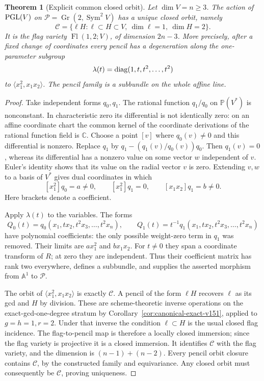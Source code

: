 \documentclass[11pt,reqno]{amsart}
\numberwithin{equation}{section}
\newtheorem{theorem}{Theorem}[section]
\theoremstyle{definition}\newtheorem{definition}[theorem]{Definition}
\theoremstyle{remark}\newtheorem{remark}[theorem]{Remark}
\newcommand{\C}{\mathbb C}\newcommand{\Q}{\mathbb Q}
\newcommand{\Pj}{\mathbb P}\newcommand{\A}{\mathbb A}
\DeclareMathOperator{\Sym}{Sym}\DeclareMathOperator{\Gr}{Gr}
\begin{document}
\begin{theorem}[Explicit common closed orbit]
\label{thm:closed-pencil-v151}
Let \(\dim V=n\geq3\).  The action of \(\operatorname{PGL}(V)\) on
\(\mathscr P=\Gr(2,\Sym^2V)\) has a unique closed orbit, namely
\begin{equation}\label{eq:flag-orbit-v151}
 \mathscr C=\{\ell H:\ell\subset H\subset V,\
                      \dim\ell=1,\ \dim H=2\}.
\end{equation}
It is the flag variety \(\operatorname{Fl}(1,2;V)\), of dimension
\(2n-3\).  More precisely, after a fixed change of coordinates every
pencil has a degeneration along the one-parameter subgroup
\[
                  \lambda(t)=\operatorname{diag}(1,t,t^2,\ldots,t^2)
\]
to \(\langle x_1^2,x_1x_2\rangle\).  The pencil family is a
subbundle on the whole affine line.
\end{theorem}
\begin{proof}
Take independent forms \(q_0,q_1\).  The rational function
\(q_1/q_0\) on \(\Pj(V^*)\) is nonconstant.  In characteristic
zero its differential is not identically zero: on an affine coordinate
chart the common kernel of the coordinate derivations of the rational
function field is \(\C\).  Choose a point \([v]\) where \(q_0(v)\ne0\)
and this differential is nonzero.  Replace \(q_1\) by
\(q_1-(q_1(v)/q_0(v))q_0\).  Then \(q_1(v)=0\), whereas its
differential has a nonzero value on some vector \(w\) independent of
\(v\).  Euler's identity shows that its value on the radial vector
\(v\) is zero.  Extending \(v,w\) to a basis of \(V^*\) gives dual
coordinates in which
\[
 [x_1^2]q_0=a\ne0,\qquad [x_1^2]q_1=0,
                                  \qquad [x_1x_2]q_1=b\ne0.
\]
Here brackets denote a coefficient.

Apply \(\lambda(t)\) to the variables.  The forms
\[
 Q_0(t)=q_0(x_1,tx_2,t^2x_3,\ldots,t^2x_n),\qquad
 Q_1(t)=t^{-1}q_1(x_1,tx_2,t^2x_3,\ldots,t^2x_n)
\]
have polynomial coefficients: the only possible weight-zero term in
\(q_1\) was removed.  Their limits are \(a x_1^2\) and
\(b x_1x_2\).  For \(t\ne0\) they span a coordinate transform of
\(R\); at zero they are independent.  Thus their coefficient matrix
has rank two everywhere, defines a subbundle, and supplies the asserted
morphism from \(\A^1\) to \(\mathscr P\).

The orbit of \(\langle x_1^2,x_1x_2\rangle\) is exactly
\(\mathscr C\).  A pencil of the form \(\ell H\) recovers \(\ell\)
as its gcd and \(H\) by division.  These are scheme-theoretic inverse
operations on the exact-gcd-one-degree stratum by
Corollary~\ref{cor:canonical-exact-v151}, applied to \(g=h=1,r=2\).
Under that inverse the condition \(\ell\subset H\) is the usual
closed flag incidence.  The flag-to-pencil map is therefore a locally
closed immersion; since the flag variety is projective it is a closed
immersion.  It identifies \(\mathscr C\) with the flag variety, and
the dimension is \((n-1)+(n-2)\).  Every pencil orbit closure contains
\(\mathscr C\), by the constructed family and equivariance.  Any
closed orbit must consequently be \(\mathscr C\), proving uniqueness.
\end{proof}
\end{document}
